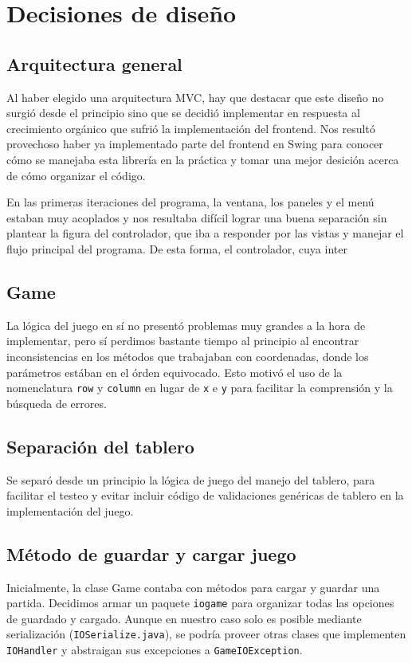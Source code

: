 \documentclass[a4paper, 11pt]{article}
\begin{document}
\section{Decisiones de diseño} 

	\subsection{Arquitectura general}
	Al haber elegido una arquitectura MVC, hay que destacar que este diseño no surgió desde el principio sino que se decidió implementar en respuesta al crecimiento orgánico que sufrió la implementación del frontend. Nos resultó provechoso haber ya implementado parte del frontend en Swing para conocer cómo se manejaba esta librería en la práctica y tomar una mejor desición acerca de cómo organizar el código.

	En las primeras iteraciones del programa, la ventana, los paneles y el menú estaban muy acoplados y nos resultaba difícil lograr una buena separación sin plantear la figura del controlador, que iba a responder por las vistas y manejar el flujo principal del programa. De esta forma, el controlador, cuya inter 
	
	\subsection{Game}
	La lógica del juego en sí no presentó problemas muy grandes a la hora de implementar, pero sí perdimos bastante tiempo al principio al encontrar inconsistencias en los métodos que trabajaban con coordenadas, donde los parámetros estában en el órden equivocado. Esto motivó el uso de la nomenclatura \texttt{row} y \texttt{column} en lugar de \texttt{x} e \texttt{y} para facilitar la comprensión y la búsqueda de errores. 

	\subsection{Separación del tablero}
	Se separó desde un principio la lógica de juego del manejo del tablero, para facilitar el testeo y evitar incluir código de validaciones genéricas de tablero en la implementación del juego.

	\subsection{Método de guardar y cargar juego}
	Inicialmente, la clase Game contaba con métodos para cargar y guardar una partida. Decidimos armar un paquete \texttt{iogame} para organizar todas las opciones de guardado y cargado. Aunque en nuestro caso solo es posible mediante serialización (\texttt{IOSerialize.java}), se podría proveer otras clases que implementen \texttt{IOHandler} y abstraigan sus excepciones a \texttt{GameIOException}.
\end{document}
